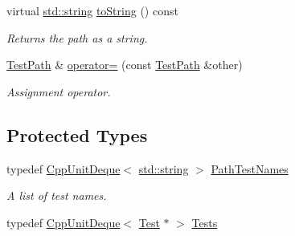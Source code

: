 \begin{DoxyCompactItemize}
virtual \hyperlink{glew_8h_ae84541b4f3d8e1ea24ec0f466a8c568b}{std\-::string} \hyperlink{class_test_path_a75ec4a351f0734cefbf449325d7442ee}{to\-String} () const 
\begin{DoxyCompactList}\small\item\em Returns the path as a string. \end{DoxyCompactList}\item 
\hyperlink{class_test_path}{Test\-Path} \& \hyperlink{class_test_path_aff11ba5cda48eb2a9c657e848650945f}{operator=} (const \hyperlink{class_test_path}{Test\-Path} \&other)
\begin{DoxyCompactList}\small\item\em Assignment operator. \end{DoxyCompactList}\end{DoxyCompactItemize}
\subsection*{Protected Types}
\begin{DoxyCompactItemize}
\item 
typedef \hyperlink{_cpp_unit_deque_8h_a3425728ebb9dff4afd4dcb7e6f270905}{Cpp\-Unit\-Deque}$<$ \hyperlink{glew_8h_ae84541b4f3d8e1ea24ec0f466a8c568b}{std\-::string} $>$ \hyperlink{class_test_path_a525c33f5b897710bf37cf593160e562a}{Path\-Test\-Names}
\begin{DoxyCompactList}\small\item\em A list of test names. \end{DoxyCompactList}\item 
typedef \hyperlink{_cpp_unit_deque_8h_a3425728ebb9dff4afd4dcb7e6f270905}{Cpp\-Unit\-Deque}$<$ \hyperlink{class_test}{Test} $\ast$ $>$ \hyperlink{class_test_path_aa1f2a0a7e01597a16ed041776297fbdf}{Tests}
\end{DoxyCompactItemize}
